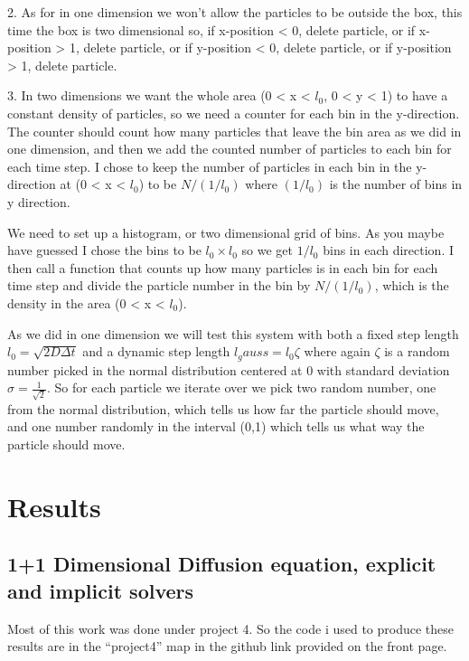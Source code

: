 \documentclass[english,a4paper,12pt]{article}
\begin{document}
2. As for in one dimension we won't allow the particles to be outside the box, this time the box is two dimensional so,
if x-position < 0, delete particle, or if x-position > 1, delete particle, or if y-position < 0, delete particle, or if y-position > 1, delete particle.

3. In two dimensions we want the whole area (0 < x < $l_0$, 0 < y < 1) to have a constant density of particles, so we need a counter
for each bin in the y-direction. The counter should count how many particles that leave the bin area as we did in one dimension, 
and then we add the counted number of particles to each bin for each time step. I chose to keep the number of particles in each bin
in the y-direction at (0 < x < $l_0$) to be $N/(1/l_0)$ where $(1/l_0)$ is the number of bins in y direction.

We need to set up a histogram, or two dimensional grid of bins. As you maybe have guessed I chose the bins to be $l_0\times l_0$ so we get
$1/l_0$ bins in each direction. I then call a function that counts up how many particles is in each bin for each time step and
divide the particle number in the bin by $N/(1/l_0)$, which is the density in the area (0 < x < $l_0$).

As we did in one dimension we will test this system with both a fixed step length $l_0 = \sqrt{2D\Delta{t}}$ and a dynamic step length
$l_gauss = l_0\zeta$ where again $\zeta$ is a random number picked in the normal distribution centered at $0$ with standard deviation $\sigma = \frac{1}{\sqrt{2}}$.
So for each particle we iterate over we pick two random number, one from the normal distribution, which tells us how far the particle
should move, and one number randomly in the interval (0,1) which tells us what way the particle should move.




\section*{Results}

\subsection*{1+1 Dimensional Diffusion equation, explicit and implicit solvers}

Most of this work was done under project 4. So the code i used to produce these results are in the ``project4'' map in the github link
provided on the front page.
\end{document}
